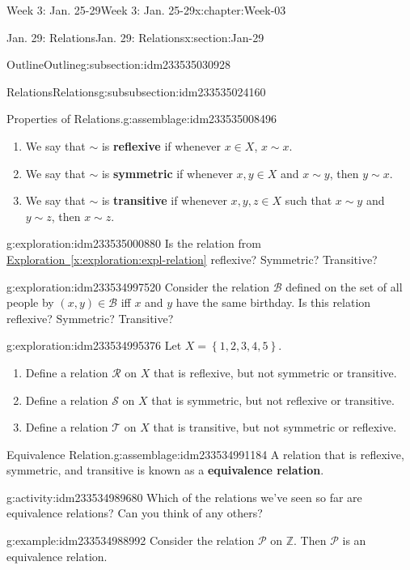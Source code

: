 \documentclass[oneside,10pt,]{book}
\newcommand{\xreffont}{\relax}
\newcommand{\terminology}[1]{\textbf{#1}}
\numberwithin{equation}{section}
\newcommand{\set}[1]{\left\{ {#1} \right\}}
\begin{document}
\begin{chapterptx}{Week 3: Jan. 25-29}{}{Week 3: Jan. 25-29}{}{}{x:chapter:Week-03}
\begin{sectionptx}{Jan. 29: Relations}{}{Jan. 29: Relations}{}{}{x:section:Jan-29}
\begin{subsectionptx}{Outline}{}{Outline}{}{}{g:subsection:idm233535030928}
\begin{subsubsectionptx}{Relations}{}{Relations}{}{}{g:subsubsection:idm233535024160}
\begin{assemblage}{Properties of Relations.}{g:assemblage:idm233535008496}
\begin{enumerate}
\item{}We say that \(\sim\) is \terminology{reflexive} if whenever \(x\in X\), \(x\sim x\).%
\item{}We say that \(\sim\) is \terminology{symmetric} if whenever \(x,y\in X\) and \(x\sim y\), then \(y\sim x\).%
\item{}We say that \(\sim\) is \terminology{transitive} if whenever \(x,y,z\in X\) such that \(x\sim y\) and \(y\sim z\), then \(x\sim z\).%
\end{enumerate}
%
\end{assemblage}
\begin{exploration}{}{g:exploration:idm233535000880}%
Is the relation from \hyperref[x:exploration:expl-relation]{Exploration~{\xreffont\ref{x:exploration:expl-relation}}} reflexive? Symmetric? Transitive?%
\end{exploration}%
\begin{exploration}{}{g:exploration:idm233534997520}%
Consider the relation \(\mathcal{B}\) defined on the set of all people by \((x,y)\in \mathcal{B}\) iff \(x\) and \(y\) have the same birthday. Is this relation reflexive? Symmetric? Transitive?%
\end{exploration}%
\begin{exploration}{}{g:exploration:idm233534995376}%
Let \(X = \set{1,2,3,4,5}\).%
%
\begin{enumerate}
\item{}Define a relation \(\mathcal{R}\) on \(X\) that is reflexive, but not symmetric or transitive.%
\item{}Define a relation \(\mathcal{S}\) on \(X\) that is symmetric, but not reflexive or transitive.%
\item{}Define a relation \(\mathcal{T}\) on \(X\) that is transitive, but not symmetric or reflexive.%
\end{enumerate}
\end{exploration}%
\begin{assemblage}{Equivalence Relation.}{g:assemblage:idm233534991184}%
A relation that is reflexive, symmetric, and transitive is known as a \terminology{equivalence relation}.%
\end{assemblage}
\begin{activity}{}{g:activity:idm233534989680}%
Which of the relations we've seen so far are equivalence relations? Can you think of any others?%
\end{activity}%
\begin{example}{}{g:example:idm233534988992}%
Consider the relation \(\mathcal{P}\) on \(\mathbb{Z}\). Then \(\mathcal{P}\) is an equivalence relation.%

\end{example}
\end{subsubsectionptx}
\end{subsectionptx}
\end{sectionptx}
\end{chapterptx}
\end{document}
